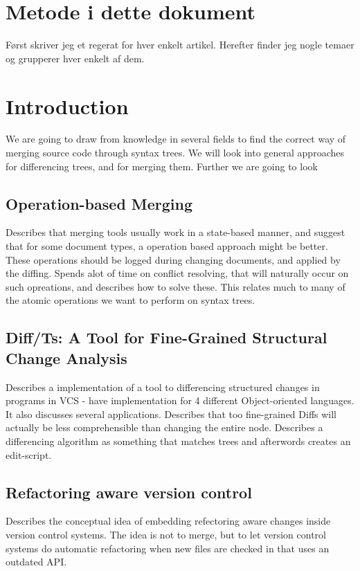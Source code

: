 \documentclass[12pt]{article}
\begin{document}
\maketitle

\section{Metode i dette dokument}
Først skriver jeg et regerat for hver enkelt artikel. Herefter finder jeg nogle temaer og grupperer hver enkelt af dem.

\section{Introduction}
We are going to draw from knowledge in several fields to find the correct way of merging source code through syntax trees. We will look into general approaches for differencing trees, and for merging them. Further we are going to look 	

\subsection{Operation-based Merging}
Describes that merging tools usually work in a state-based manner, and suggest that for some document types, a operation based approach might be better. These operations should be logged during changing documents, and applied by the diffing. Spends alot of time on conflict resolving, that will naturally occur on such opreations, and describes how to solve these. This relates much to many of the atomic operations we want to perform on syntax trees.

\subsection{Diff/Ts: A Tool for Fine-Grained Structural Change Analysis}
Describes a implementation of a tool to differencing structured changes in programs in VCS - have implementation for 4 different Object-oriented languages. It also discusses several applications. Describes that too fine-grained Diffs will actually be less comprehensible than changing the entire node. Describes a differencing algorithm as something that matches trees and afterwords creates an edit-script.

\subsection{Refactoring aware version control}
Describes the conceptual idea of embedding refectoring aware changes inside version control systems. The idea is not to merge, but to let version control systems do automatic refactoring when new files are checked in that uses an outdated API. 
\end{document}
